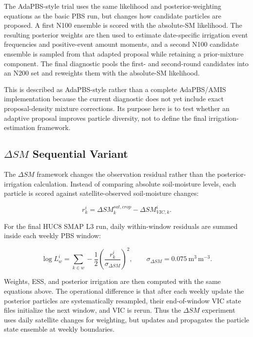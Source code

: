 \documentclass[11pt]{article}
\begin{document}
The AdaPBS-style trial uses the same likelihood and posterior-weighting equations as the basic PBS run, but changes how candidate particles are proposed. A first N100 ensemble is scored with the absolute-SM likelihood. The resulting posterior weights are then used to estimate date-specific irrigation event frequencies and positive-event amount moments, and a second N100 candidate ensemble is sampled from that adapted proposal while retaining a prior-mixture component. The final diagnostic pools the first- and second-round candidates into an N200 set and reweights them with the absolute-SM likelihood.

This is described as AdaPBS-style rather than a complete AdaPBS/AMIS implementation because the current diagnostic does not yet include exact proposal-density mixture corrections. Its purpose here is to test whether an adaptive proposal improves particle diversity, not to define the final irrigation-estimation framework.

\subsection{\texorpdfstring{$\Delta SM$}{Delta SM} Sequential Variant}

The $\Delta SM$ framework changes the observation residual rather than the posterior-irrigation calculation. Instead of comparing absolute soil-moisture levels, each particle is scored against satellite-observed soil-moisture changes:

\begin{equation}
r^i_k = \Delta SM^{sat,crop}_{k} - \Delta SM^{i}_{VIC,k}.
\label{eq:method_delta_resid}
\end{equation}

For the final HUC8 SMAP L3 run, daily within-window residuals are summed inside each weekly PBS window:

\begin{equation}
\log L^i_w = \sum_{k \in w} -\frac{1}{2}\left(\frac{r^i_k}{\sigma_{\Delta SM}}\right)^2,
\qquad \sigma_{\Delta SM}=0.075\ \mathrm{m^3\,m^{-3}}.
\label{eq:method_delta_loglik}
\end{equation}

Weights, ESS, and posterior irrigation are then computed with the same equations above. The operational difference is that after each weekly update the posterior particles are systematically resampled, their end-of-window VIC state files initialize the next window, and VIC is rerun. Thus the $\Delta SM$ experiment uses daily satellite changes for weighting, but updates and propagates the particle state ensemble at weekly boundaries.
\end{document}
